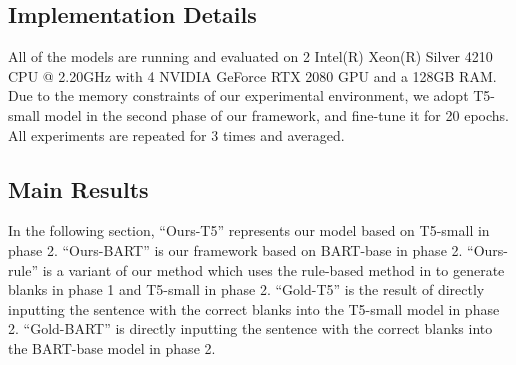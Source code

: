 \subsection{Implementation Details}

All of the models are running and evaluated on 2 Intel(R) Xeon(R) Silver 4210 CPU @ 2.20GHz with 4 NVIDIA GeForce RTX 2080 GPU and a 128GB RAM. Due to the memory constraints of our experimental environment,
we adopt T5-small model in the second phase of our framework, and fine-tune it for 20 epochs. All experiments are repeated for 3 times and averaged.


\subsection{Main Results}
\label{sec:main-results}
In the following section, ``Ours-T5'' represents our model based on T5-small in phase 2. ``Ours-BART'' is our framework based on BART-base  in phase 2. ``Ours-rule'' is a variant of our method which uses the rule-based method in  to generate blanks in phase 1 and T5-small in phase 2. ``Gold-T5'' is the result of directly inputting the sentence with the correct blanks into the T5-small model in phase 2. ``Gold-BART'' is directly inputting the sentence with the correct blanks into the BART-base model in phase 2.



